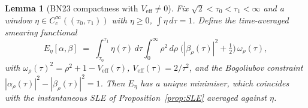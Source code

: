 \documentclass[12pt,letterpaper]{article}
\newtheorem{lemma}[theorem]{Lemma}
\begin{document}
\begin{lemma}[BN23 compactness with $V_{\mathrm{eff}}\neq 0$]
\label{lem:BNcompact}
Fix $\sqrt{2}<\tau_{0}<\tau_{1}<\infty$ and a window
$\eta\in C_{c}^{\infty}((\tau_{0},\tau_{1}))$ with $\eta\ge 0$,
$\int\eta\,d\tau=1$.  Define the time-averaged smearing functional
\begin{equation}
  E_{\eta}[\alpha,\beta]
  \;=\;\int_{\tau_{0}}^{\tau_{1}}\eta(\tau)\,d\tau
       \int_{0}^{\infty}\!\!\!\rho^{2}\,d\rho\;
       \bigl(|\beta_{\rho}(\tau)|^{2}+\tfrac{1}{2}\bigr)\,
       \omega_{\rho}(\tau),
  \label{eq:Eeta}
\end{equation}
with $\omega_{\rho}(\tau)^{2}=\rho^{2}+1-V_{\mathrm{eff}}(\tau)$,
$V_{\mathrm{eff}}(\tau)=2/\tau^{2}$, and the Bogoliubov constraint
$|\alpha_{\rho}(\tau)|^{2}-|\beta_{\rho}(\tau)|^{2}=1$.
Then $E_{\eta}$ has a unique minimiser, which coincides with the
instantaneous SLE of Proposition~\ref{prop:SLE} averaged against
$\eta$.
\end{lemma}
\end{document}
